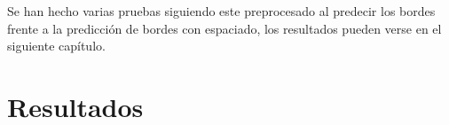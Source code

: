 Se han hecho varias pruebas siguiendo este preprocesado al predecir los bordes frente a la predicción de bordes con espaciado, los resultados pueden verse en el siguiente capítulo.

\section{Resultados}\label{sec:dt_watershed_resultados}
